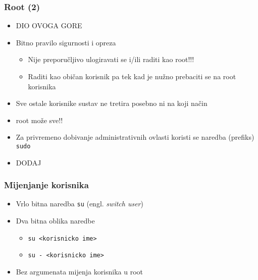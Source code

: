 \documentclass[table,usenames,dvipsnames] {beamer}
\newcommand{\shell}[1]{\texttt{#1}}
\begin{document}
\begin{frame}[t]
\frametitle{Root (2)} 
\begin{itemize}
	\item DIO OVOGA GORE
  \item Bitno pravilo sigurnosti i opreza
  \begin{itemize}
    \item Nije preporučljivo ulogiravati se i/ili raditi kao root!!!
    \item Raditi kao običan korisnik pa tek kad je nužno prebaciti se na 
          root korisnika
  \end{itemize}
  \item Sve ostale korisnike sustav ne tretira posebno ni na koji način
  \item root može sve!!
  \item Za privremeno dobivanje administrativnih ovlasti koristi se naredba (prefiks) \shell{sudo}
  \item DODAJ
\end{itemize}
\end{frame}

\begin{frame}[t]
\frametitle{Mijenjanje korisnika} 
\begin{itemize}
  \item Vrlo bitna naredba \shell{su} (engl. \emph{switch user})
  \item Dva bitna oblika naredbe
  \begin{itemize}
    \item \shell{su <korisnicko ime>}
    \item \shell{su - <korisnicko ime>}
  \end{itemize}
  \item Bez argumenata mijenja korisnika u root
\end{itemize}
\end{frame}
\end{document}
